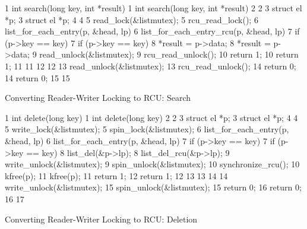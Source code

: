 \begin{listing*}[htbp]
{ \scriptsize
\begin{verbbox}
 1 int search(long key, int *result)     1 int search(long key, int *result)
 2 {                                     2 {
 3   struct el *p;                       3   struct el *p;
 4                                       4
 5   read_lock(&listmutex);              5   rcu_read_lock();
 6   list_for_each_entry(p, &head, lp) { 6   list_for_each_entry_rcu(p, &head, lp) {
 7     if (p->key == key) {              7     if (p->key == key) {
 8       *result = p->data;              8       *result = p->data;
 9       read_unlock(&listmutex);        9       rcu_read_unlock();
10       return 1;                      10       return 1;
11     }                                11     }
12   }                                  12   }
13   read_unlock(&listmutex);           13   rcu_read_unlock();
14   return 0;                          14   return 0;
15 }                                    15 }
\end{verbbox}
}
\hspace*{0.9in}\OneColumnHSpace{-0.5in}
\IfEbookSize{\hspace*{-1.05in}}{}\theverbbox
\caption{Converting Reader-Writer Locking to RCU: Search}
\label{lst:defer:Converting Reader-Writer Locking to RCU: Search}
\end{listing*}

\begin{listing*}[htbp]
{ \scriptsize
\begin{verbbox}
 1 int delete(long key)                  1 int delete(long key)
 2 {                                     2 {
 3   struct el *p;                       3   struct el *p;
 4                                       4
 5   write_lock(&listmutex);             5   spin_lock(&listmutex);
 6   list_for_each_entry(p, &head, lp) { 6   list_for_each_entry(p, &head, lp) {
 7     if (p->key == key) {              7     if (p->key == key) {
 8       list_del(&p->lp);               8       list_del_rcu(&p->lp);
 9       write_unlock(&listmutex);       9       spin_unlock(&listmutex);
                                        10       synchronize_rcu();
10       kfree(p);                      11       kfree(p);
11       return 1;                      12       return 1;
12     }                                13     }
13   }                                  14   }
14   write_unlock(&listmutex);          15   spin_unlock(&listmutex);
15   return 0;                          16   return 0;
16 }                                    17 }
\end{verbbox}
}
\hspace*{0.9in}\OneColumnHSpace{-0.5in}
\IfEbookSize{\hspace*{-1.05in}}{}\theverbbox
\caption{Converting Reader-Writer Locking to RCU: Deletion}
\label{lst:defer:Converting Reader-Writer Locking to RCU: Deletion}
\end{listing*}

